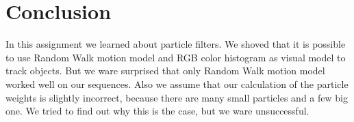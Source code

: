 \documentclass[runningheads]{llncs}
\begin{document}
\section{Conclusion}
In this assignment we learned about particle filters. We shoved that it is possible to use Random Walk motion model and RGB color histogram as visual model to track objects. But we ware surprised that only Random Walk motion model worked well on our sequences. Also we assume that our calculation of the particle weights is slightly incorrect, because there are many small particles and a few big one. We tried to find out why this is the case, but we ware unsuccessful.
\end{document}

